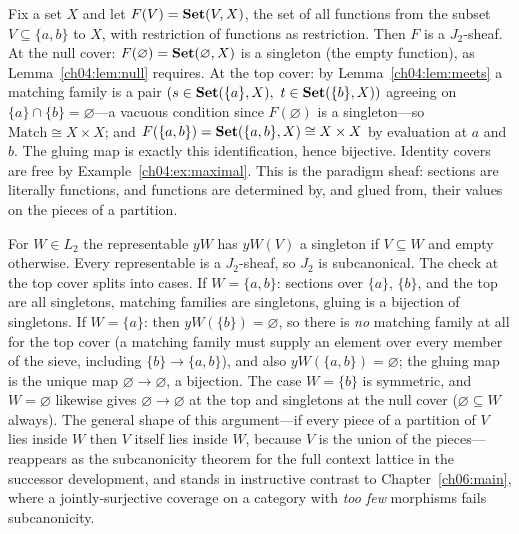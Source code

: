 \begin{example}\label{ch04:ex:functions}
Fix a set $X$ and let $F(V)=\mathbf{Set}(V,X)$, the set of all functions from the
subset $V\subseteq\{a,b\}$ to $X$, with restriction of functions as
restriction. Then $F$ is a $J_2$-sheaf. At the null cover:
$F(\varnothing)=\mathbf{Set}(\varnothing,X)$ is a singleton (the empty function), as
Lemma~\ref{ch04:lem:null} requires. At the top cover: by
Lemma~\ref{ch04:lem:meets} a matching family is a pair
$(s\in\Set(\{a\},X),\ t\in\Set(\{b\},X))$ agreeing on
$\{a\}\cap\{b\}=\varnothing$---a vacuous condition since
$F(\varnothing)$ is a singleton---so
$\mathrm{Match}\cong X\times X$; and $F(\{a,b\})=\mathbf{Set}(\{a,b\},X)\cong
X\times X$ by evaluation at $a$ and $b$. The gluing map is exactly this
identification, hence bijective. Identity covers are free by
Example~\ref{ch04:ex:maximal}. This is the paradigm sheaf: sections are
literally functions, and functions are determined by, and glued from, their
values on the pieces of a partition.
\end{example}

\begin{example}\label{ch04:ex:representables}
For $W\in L_2$ the representable $yW$ has $yW(V)$ a singleton if $V\subseteq W$
and empty otherwise. Every representable is a $J_2$-sheaf, so $J_2$ is
subcanonical. The check at the top cover splits into cases. If
$W=\{a,b\}$: sections over $\{a\}$, $\{b\}$, and the top are all singletons,
matching families are singletons, gluing is a bijection of singletons. If
$W=\{a\}$: then $yW(\{b\})=\varnothing$, so there is \emph{no} matching family
at all for the top cover (a matching family must supply an element over every
member of the sieve, including $\{b\}\to\{a,b\}$), and also
$yW(\{a,b\})=\varnothing$; the gluing map is the unique map
$\varnothing\to\varnothing$, a bijection. The case $W=\{b\}$ is symmetric, and
$W=\varnothing$ likewise gives $\varnothing\to\varnothing$ at the top and
singletons at the null cover ($\varnothing\subseteq W$ always). The general
shape of this argument---if every piece of a partition of $V$ lies inside $W$
then $V$ itself lies inside $W$, because $V$ is the union of the
pieces---reappears as the subcanonicity theorem for the full context lattice
in the successor development, and stands in instructive contrast to
Chapter~\ref{ch06:main}, where a jointly-surjective coverage on a category
with \emph{too few} morphisms fails subcanonicity.
\end{example}

